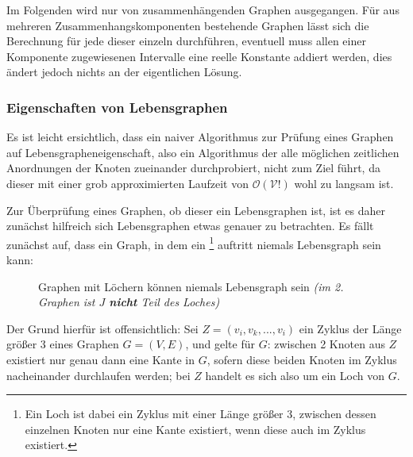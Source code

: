 Im Folgenden wird nur von zusammenhängenden Graphen ausgegangen. Für aus mehreren Zusammenhangskomponenten bestehende Graphen lässt sich die Berechnung für jede dieser einzeln durchführen, eventuell muss allen einer Komponente zugewiesenen Intervalle eine reelle Konstante addiert werden, dies ändert jedoch nichts an der eigentlichen Lösung.

\subsubsection{Eigenschaften von Lebensgraphen}

Es ist leicht ersichtlich, dass ein naiver Algorithmus zur Prüfung eines Graphen auf Lebensgrapheneigenschaft, also ein Algorithmus der alle möglichen zeitlichen Anordnungen der Knoten zueinander  durchprobiert, nicht zum Ziel führt, da dieser mit einer grob approximierten Laufzeit von $\mathcal{O(V!)}$ wohl zu langsam ist.

Zur Überprüfung eines Graphen, ob dieser ein Lebensgraphen ist, ist es daher zunächst hilfreich sich Lebensgraphen etwas genauer zu betrachten. Es fällt zunächst auf, dass ein Graph, in dem ein \footnote{Ein Loch ist dabei ein Zyklus mit einer Länge größer 3, zwischen dessen einzelnen Knoten nur eine Kante existiert, wenn diese auch im Zyklus existiert.} auftritt niemals Lebensgraph sein kann:
\begin{center}
\begin{figure}[h]
\caption{Graphen mit Löchern können niemals Lebensgraph sein \textit{(im 2. Graphen ist $J$ \textbf{nicht} Teil des Loches)}}
\end{figure}
\end{center}

Der Grund hierfür ist offensichtlich: Sei $Z = (v_i,v_k,...,v_i)$ ein Zyklus der Länge größer 3 eines Graphen $G = (V,E)$, und gelte für $G$: zwischen 2 Knoten aus $Z$ existiert nur genau dann eine Kante in $G$, sofern diese beiden Knoten im Zyklus nacheinander durchlaufen werden; bei $Z$ handelt es sich also um ein Loch von $G$.

